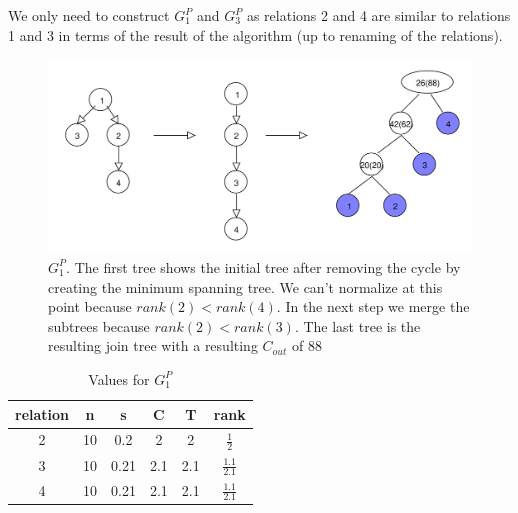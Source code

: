 \documentclass[11pt,a4paper]{scrartcl}
\begin{document}
We only need to construct $G^P_1$ and $G^P_3$ as relations 2 and 4 are similar to relations 1 and 3 in terms of the result of the algorithm (up to renaming of the relations).

\begin{figure}[H]
	\begin{center}
		\includegraphics[width=\textwidth]{graphs/gp1}
	\end{center}
	\caption{$G^P_1$. The first tree shows the initial tree after removing the cycle by creating the minimum spanning tree. We can't normalize at this point because $rank(2)<rank(4)$. In the next step we merge the subtrees because $rank(2)<rank(3)$. The last tree is the resulting join tree with a resulting $C_{out}$ of 88}
	\label{fig:gp1}
\end{figure}

\begin{table}[H]
  \caption{Values for $G^P_1$}
  \begin{center}
 \begin{tabular}{c|c|c|c|c|c}
  relation & n & s & C & T & rank\\
  \hline 
  2 & 10 & 0.2 & 2 & 2 & $\frac{1}{2}$ \\
  3 & 10 & 0.21 & 2.1 & 2.1 & $\frac{1.1}{2.1}$ \\
  4 & 10 & 0.21 & 2.1 & 2.1 & $\frac{1.1}{2.1}$ \\
 \end{tabular}  
  \end{center}
 \label{tab:gp1}
\end{table}
\end{document}
